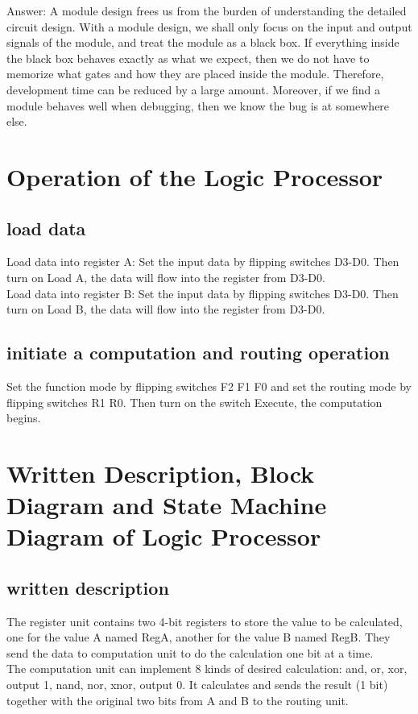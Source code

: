 \documentclass[12pt]{article}
\begin{document}
Answer: A module design frees us from the burden of understanding the detailed circuit design. With a module design, we shall only focus on the input and output signals of the module, and treat the module as a black box. If everything inside the black box behaves exactly as what we expect, then we do not have to memorize what gates and how they are placed inside the module. Therefore, development time can be reduced by a large amount. Moreover, if we find a module behaves well when debugging, then we know the bug is at somewhere else.

\section{Operation of the Logic Processor}
\subsection{load data}
Load data into register A:  Set the input data by flipping switches D3-D0. Then turn on Load A, the data will flow into the register from D3-D0. \\
Load data into register B:  Set the input data by flipping switches D3-D0. Then turn on Load B, the data will flow into the register from D3-D0.

\subsection{initiate a computation and routing operation}
Set the function mode by flipping switches F2 F1 F0 and set the routing mode by flipping switches R1 R0. Then turn on the switch Execute, the computation begins. 

\section{Written Description, Block Diagram and State Machine Diagram of Logic Processor}
\subsection{written description}
The register unit contains two 4-bit registers to store the value to be calculated, one for the value A named RegA, another for the value B named RegB. They send the data to computation unit to do the calculation one bit at a time. \\

The computation unit can implement 8 kinds of desired calculation: and, or, xor, output 1, nand, nor, xnor, output 0. It calculates and sends the result (1 bit) together with the original two bits from A and B to the routing unit. \\
\end{document}
